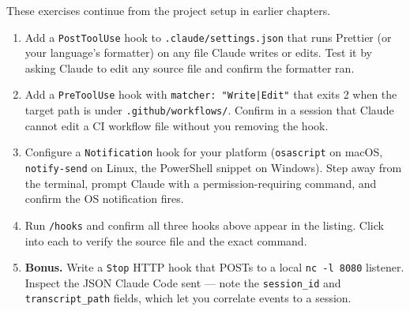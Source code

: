 \begin{exercisebox}
These exercises continue from the project setup in earlier chapters.

\begin{enumerate}
  \item Add a \texttt{PostToolUse} hook to \texttt{.claude/settings.json}
        that runs Prettier (or your language's formatter) on any file
        Claude writes or edits. Test it by asking Claude to edit any
        source file and confirm the formatter ran.
  \item Add a \texttt{PreToolUse} hook with \texttt{matcher: "Write|Edit"}
        that exits 2 when the target path is under
        \texttt{.github/workflows/}. Confirm in a session that Claude
        cannot edit a CI workflow file without you removing the hook.
  \item Configure a \texttt{Notification} hook for your platform
        (\texttt{osascript} on macOS, \texttt{notify-send} on Linux, the
        PowerShell snippet on Windows). Step away from the terminal,
        prompt Claude with a permission-requiring command, and confirm
        the OS notification fires.
  \item Run \texttt{/hooks} and confirm all three hooks above appear in
        the listing. Click into each to verify the source file and the
        exact command.
  \item \textbf{Bonus.} Write a \texttt{Stop} HTTP hook that POSTs to a
        local \texttt{nc -l 8080} listener. Inspect the JSON Claude Code
        sent — note the \texttt{session\_id} and \texttt{transcript\_path}
        fields, which let you correlate events to a session.
\end{enumerate}
\end{exercisebox}

